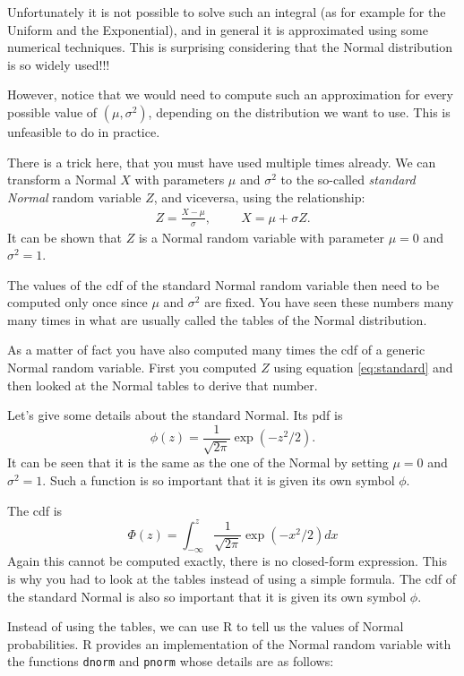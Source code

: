 \documentclass[
]{book}
\theoremstyle{definition}
\theoremstyle{definition}
\theoremstyle{definition}
\theoremstyle{definition}
\theoremstyle{remark}
\begin{document}
Unfortunately it is not possible to solve such an integral (as for example for the Uniform and the Exponential), and in general it is approximated using some numerical techniques. This is surprising considering that the Normal distribution is so widely used!!!

However, notice that we would need to compute such an approximation for every possible value of \((\mu,\sigma^2)\), depending on the distribution we want to use. This is unfeasible to do in practice.

There is a trick here, that you must have used multiple times already. We can transform a Normal \(X\) with parameters \(\mu\) and \(\sigma^2\) to the so-called \emph{standard Normal} random variable \(Z\), and viceversa, using the relationship:
\begin{align}
 \label{eq:standard}
Z = \frac{X-\mu}{\sigma}, \hspace{1cm} X= \mu + \sigma Z.
\end{align}
It can be shown that \(Z\) is a Normal random variable with parameter \(\mu=0\) and \(\sigma^2=1\).

The values of the cdf of the standard Normal random variable then need to be computed only once since \(\mu\) and \(\sigma^2\) are fixed. You have seen these numbers many many times in what are usually called the tables of the Normal distribution.

As a matter of fact you have also computed many times the cdf of a generic Normal random variable. First you computed \(Z\) using equation \eqref{eq:standard} and then looked at the Normal tables to derive that number.

Let's give some details about the standard Normal. Its pdf is
\[
\phi(z)=\frac{1}{\sqrt{2\pi}}\exp\left(-z^2/2\right).
\]
It can be seen that it is the same as the one of the Normal by setting \(\mu=0\) and \(\sigma^2=1\). Such a function is so important that it is given its own symbol \(\phi\).

The cdf is
\[
\Phi(z)=\int_{-\infty}^z\frac{1}{\sqrt{2\pi}}\exp\left(-x^2/2\right)dx
\]
Again this cannot be computed exactly, there is no closed-form expression. This is why you had to look at the tables instead of using a simple formula. The cdf of the standard Normal is also so important that it is given its own symbol \(\phi\).

Instead of using the tables, we can use R to tell us the values of Normal probabilities. R provides an implementation of the Normal random variable with the functions \texttt{dnorm} and \texttt{pnorm} whose details are as follows:
\end{document}

